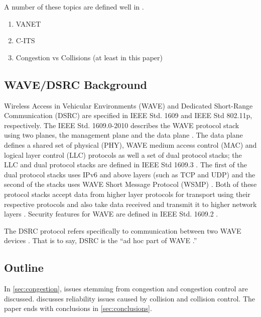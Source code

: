 \documentclass[twoside,conference]{IEEEtran}
\begin{document}
	A number of these topics are defined well in \cite{Serageldin2013}.
	\begin{enumerate}
		\item VANET
		\item C-ITS
		\item Congestion vs Collisions (at least in this paper)
	\end{enumerate}
	
	\subsection{WAVE/DSRC Background}
		Wireless Access in Vehicular Environments (WAVE) and Dedicated Short-Range Communication (DSRC) are specified in IEEE Std. 1609 and IEEE Std 802.11p, respectively.  The IEEE Std. 1609.0-2010 describes the WAVE protocol stack using two planes, the management plane and the data plane \cite[p. 16]{IEEE2014-Std1609.0-2013}.  The data plane defines a shared set of physical (PHY), WAVE medium access control (MAC) and logical layer control (LLC) protocols as well a set of dual protocol stacks; the LLC and dual protocol stacks are defined in IEEE Std 1609.3 \cite[pp. 16--17]{IEEE2014-Std1609.0-2013}.  The first of the dual protocol stacks uses IPv6 and above layers (such as TCP and UDP) and the second of the stacks uses WAVE Short Message Protocol (WSMP) \cite[p. 9]{IEEE2010-Std1609.3-2010}.  Both of these protocol stacks accept data from higher layer protocols for transport using their respective protocols and also take data received and transmit it to higher network layers \cite[p. 9]{IEEE2010-Std1609.3-2010}.  Security features for WAVE are defined in IEEE Std. 1609.2 \cite{IEEE2013-Std1609.2-2013}.
	
		The DSRC protocol refers specifically to communication between two WAVE devices \cite{Serageldin2013}.  That is to say, DSRC is the ``ad hoc part of WAVE \cite[p. 9]{Uhlemann2015}.''
	
	\subsection{Outline}
		In \cref{sec:congestion}, issues stemming from congestion and congestion control are discussed.  discusses reliability issues caused by collision and collision control.  The paper ends with conclusions in \cref{sec:conclusions}.
\end{document}
